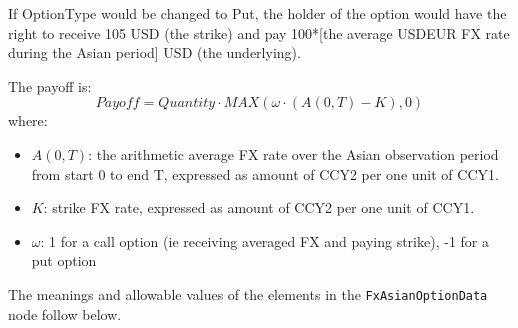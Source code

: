 If OptionType would be changed to Put, the holder of the option would have the right to  receive 105 USD (the strike) and pay 100*[the average USDEUR FX rate during the Asian period] USD (the underlying). 

The payoff is: 
$$
Payoff = Quantity\cdot MAX(\omega\cdot(A(0,T) - K),0)
$$
where:
\begin{itemize}
\item $A(0,T)$: the arithmetic average FX rate over the Asian observation period from start 0 to end T, expressed as amount of CCY2 per one unit of CCY1.
\item $K$: strike FX rate, expressed as amount of CCY2 per one unit of CCY1.
\item $\omega$: 1 for a call option (ie receiving averaged FX and paying strike), -1 for a put option
\end{itemize}


The meanings and allowable values of the elements in the \lstinline!FxAsianOptionData!  node follow below.

